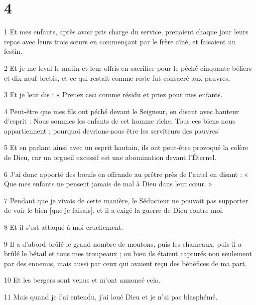 \chapter{4}

\par 1 Et mes enfants, après avoir pris charge du service, prenaient chaque jour leurs repas avec leurs trois sœurs en commençant par le frère aîné, et faisaient un festin.

\par 2 Et je me levai le matin et leur offris en sacrifice pour le péché cinquante béliers et dix-neuf brebis, et ce qui restait comme reste fut consacré aux pauvres.

\par 3 Et je leur dis : « Prenez ceci comme résidu et priez pour mes enfants.

\par 4 Peut-être que mes fils ont péché devant le Seigneur, en disant avec hauteur d'esprit : Nous sommes les enfants de cet homme riche. Tous ces biens nous appartiennent ; pourquoi devrions-nous être les serviteurs des pauvres'

\par 5 Et en parlant ainsi avec un esprit hautain, ils ont peut-être provoqué la colère de Dieu, car un orgueil excessif est une abomination devant l'Éternel.

\par 6 J'ai donc apporté des bœufs en offrande au prêtre près de l'autel en disant : « Que mes enfants ne pensent jamais de mal à Dieu dans leur cœur. »

\par 7 Pendant que je vivais de cette manière, le Séducteur ne pouvait pas supporter de voir le bien [que je faisais], et il a exigé la guerre de Dieu contre moi.

\par 8 Et il s'est attaqué à moi cruellement.

\par 9 Il a d'abord brûlé le grand nombre de moutons, puis les chameaux, puis il a brûlé le bétail et tous mes troupeaux ; ou bien ils étaient capturés non seulement par des ennemis, mais aussi par ceux qui avaient reçu des bénéfices de ma part.

\par 10 Et les bergers sont venus et m'ont annoncé cela.

\par 11 Mais quand je l'ai entendu, j'ai loué Dieu et je n'ai pas blasphémé.

